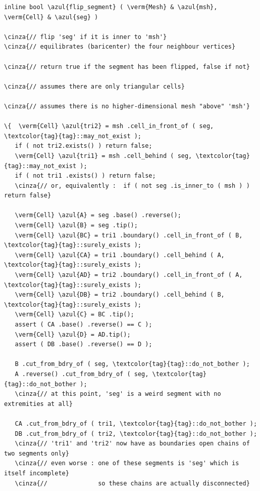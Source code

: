 \begin{Verbatim}[commandchars=\\\{\},formatcom=\small\tt,frame=single,
   label=parag-\ref{\numb section 10.\numb parag 3}.cpp,rulecolor=\color{coment},
   baselinestretch=0.94,framesep=2mm]
inline bool \azul{flip_segment} ( \verm{Mesh} & \azul{msh}, \verm{Cell} & \azul{seg} )

\cinza{// flip 'seg' if it is inner to 'msh'}
\cinza{// equilibrates (baricenter) the four neighbour vertices}

\cinza{// return true if the segment has been flipped, false if not}

\cinza{// assumes there are only triangular cells}
	
\cinza{// assumes there is no higher-dimensional mesh "above" 'msh'}

\{  \verm{Cell} \azul{tri2} = msh .cell_in_front_of ( seg, \textcolor{tag}{tag}::may_not_exist );
   if ( not tri2.exists() ) return false; 
   \verm{Cell} \azul{tri1} = msh .cell_behind ( seg, \textcolor{tag}{tag}::may_not_exist );
   if ( not tri1 .exists() ) return false;
   \cinza{// or, equivalently :  if ( not seg .is_inner_to ( msh ) ) return false}

   \verm{Cell} \azul{A} = seg .base() .reverse();
   \verm{Cell} \azul{B} = seg .tip();
   \verm{Cell} \azul{BC} = tri1 .boundary() .cell_in_front_of ( B, \textcolor{tag}{tag}::surely_exists );
   \verm{Cell} \azul{CA} = tri1 .boundary() .cell_behind ( A, \textcolor{tag}{tag}::surely_exists );
   \verm{Cell} \azul{AD} = tri2 .boundary() .cell_in_front_of ( A, \textcolor{tag}{tag}::surely_exists );
   \verm{Cell} \azul{DB} = tri2 .boundary() .cell_behind ( B, \textcolor{tag}{tag}::surely_exists );
   \verm{Cell} \azul{C} = BC .tip();
   assert ( CA .base() .reverse() == C );
   \verm{Cell} \azul{D} = AD.tip();
   assert ( DB .base() .reverse() == D );
	
   B .cut_from_bdry_of ( seg, \textcolor{tag}{tag}::do_not_bother );
   A .reverse() .cut_from_bdry_of ( seg, \textcolor{tag}{tag}::do_not_bother );
   \cinza{// at this point, 'seg' is a weird segment with no extremities at all}
     
   CA .cut_from_bdry_of ( tri1, \textcolor{tag}{tag}::do_not_bother );
   DB .cut_from_bdry_of ( tri2, \textcolor{tag}{tag}::do_not_bother );
   \cinza{// 'tri1' and 'tri2' now have as boundaries open chains of two segments only}
   \cinza{// even worse : one of these segments is 'seg' which is itself incomplete}
   \cinza{//              so these chains are actually disconnected}
   

\end{Verbatim}
